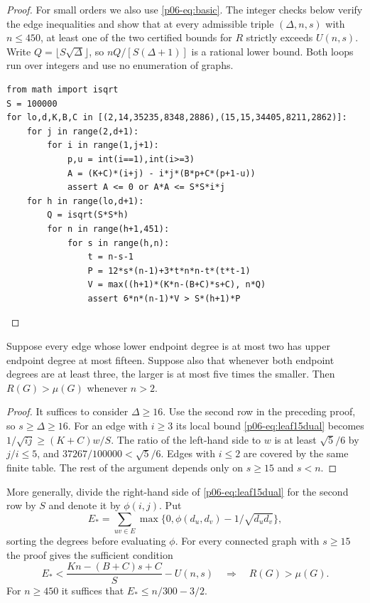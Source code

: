 \documentclass[11pt,a4paper]{article}
\begin{document}
\begin{proof}
For small orders we also use \eqref{p06-eq:basic}. The integer checks below
verify the edge inequalities and show that at every admissible triple
$(\Delta,n,s)$ with $n\le450$, at least one of the two certified bounds
for $R$ strictly exceeds $U(n,s)$. Write $Q=\lfloor S\sqrt{\Delta}\rfloor$,
so $nQ/[S(\Delta+1)]$ is a rational lower bound. Both loops run over
integers and use no enumeration of graphs.
{\small
\begin{verbatim}
from math import isqrt
S = 100000
for lo,d,K,B,C in [(2,14,35235,8348,2886),(15,15,34405,8211,2862)]:
    for j in range(2,d+1):
        for i in range(1,j+1):
            p,u = int(i==1),int(i>=3)
            A = (K+C)*(i+j) - i*j*(B*p+C*(p+1-u))
            assert A <= 0 or A*A <= S*S*i*j
    for h in range(lo,d+1):
        Q = isqrt(S*S*h)
        for n in range(h+1,451):
            for s in range(h,n):
                t = n-s-1
                P = 12*s*(n-1)+3*t*n*n-t*(t*t-1)
                V = max((h+1)*(K*n-(B+C)*s+C), n*Q)
                assert 6*n*(n-1)*V > S*(h+1)*P
\end{verbatim}
}
\end{proof}

\begin{corollary}\label{p06-cor:leaf15local}
Suppose every edge whose lower endpoint degree is at most two has upper
endpoint degree at most fifteen. Suppose also that whenever both endpoint
degrees are at least three, the larger is at most five times the smaller.
Then $R(G)>\mu(G)$ whenever $n>2$.
\end{corollary}
\begin{proof}
It suffices to consider $\Delta\ge16$. Use the second row in the preceding
proof, so $s\ge\Delta\ge16$. For an edge with $i\ge3$ its local bound
\eqref{p06-eq:leaf15dual} becomes $1/\sqrt{ij}\ge (K+C)w/S$.
The ratio of the left-hand side to $w$ is at least $\sqrt5/6$ by
$j/i\le5$, and $37267/100000<\sqrt5/6$. Edges with $i\le2$ are covered
by the same finite table. The rest of the argument depends only on
$s\ge15$ and $s<n$.
\end{proof}
More generally, divide the right-hand side of \eqref{p06-eq:leaf15dual}
for the second row by $S$ and denote it by $\phi(i,j)$. Put
\[
 E_* = \sum_{uv\in E}\max\{0,\phi(d_u,d_v)-1/\sqrt{d_ud_v}\},
\]
sorting the degrees before evaluating $\phi$. For every connected graph
with $s\ge15$ the proof gives the sufficient condition
\[
 E_* < \frac{Kn-(B+C)s+C}{S}-U(n,s)
       \quad\Longrightarrow\quad R(G)>\mu(G).
\]
For $n\ge450$ it suffices that $E_*\le n/300-3/2$.
\end{document}
